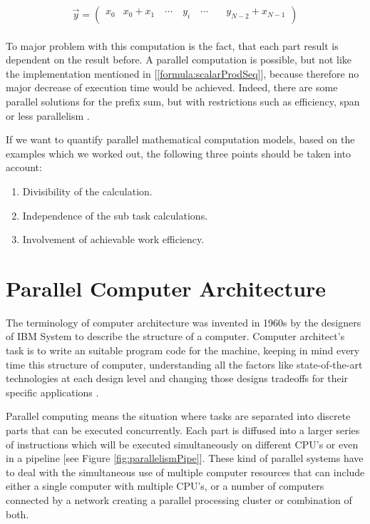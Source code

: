 \begin{equation} \label{formula:prefixSumNonFormal}
	\vec{y} = \begin{pmatrix}
		x_{0} & x_{0} + x_{1} \quad \cdots \quad y_{i} \quad \cdots \quad & y_{N - 2} + x_{N-1} \\
	\end{pmatrix}
\end{equation}
\\[2pt]
To major problem with this computation is the fact, that each part result is dependent on the result before. A parallel computation is possible, but not like the implementation mentioned in [\ref{formula:scalarProdSeq}], because therefore no major decrease of execution time would be achieved. Indeed, there are some parallel solutions for the prefix sum, but with restrictions such as efficiency, span \parencite{article21} or less parallelism \parencite{article22}.

If we want to quantify parallel mathematical computation models, based on the examples which we worked out, the following three points should be taken into account:

\begin{enumerate}
	\item Divisibility of the calculation.
	\item Independence of the sub task calculations.
	\item Involvement of achievable work efficiency. 
\end{enumerate}

\newpage

\section{Parallel Computer Architecture}\label{chap:parallelCompArch}

The terminology of computer architecture was invented in 1960s by the designers of IBM System to describe the structure of a computer. Computer architect’s task is to write an suitable program code for the machine, keeping in mind every time this structure of computer, understanding all the factors like state-of-the-art technologies at each design level and changing those designs tradeoffs for their specific applications \parencite{article20}.

Parallel computing means the situation where tasks are separated into discrete parts that can be executed concurrently. Each part is diffused into a larger series of instructions which will be executed simultaneously on different CPU's or even in a pipeline [see Figure \ref{fig:parallelismPipe}]. These kind of parallel systems have to deal with the simultaneous use of multiple computer resources that can include either a single computer with multiple CPU's, or a number of computers connected by a network creating a parallel processing cluster or combination of both.


